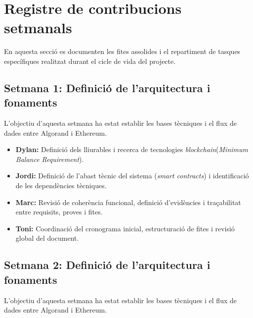 \section{Registre de contribucions setmanals}

En aquesta secció es documenten les fites assolides i el repartiment de tasques específiques realitzat durant el cicle de vida del projecte.

\subsection{Setmana 1: Definició de l'arquitectura i fonaments}

L'objectiu d'aquesta setmana ha estat establir les bases tècniques i el flux de dades entre Algorand i Ethereum.

\begin{itemize}

    \item \textbf{Dylan:} Definició dels lliurables i recerca de tecnologies \textit{blockchain}(\textit{Minimum Balance Requirement}).
    
    \item \textbf{Jordi:} Definició de l'abast tècnic del sistema (\textit{smart contracts}) i identificació de les dependències tècniques.
    
    \item \textbf{Marc:} Revisió de coherència funcional, definició d'evidències i traçabilitat entre requisits, proves i fites.
    
    \item \textbf{Toni:} Coordinació del cronograma inicial, estructuració de fites i revisió global del document.
    
\end{itemize}

\subsection{Setmana 2: Definició de l'arquitectura i fonaments}

L'objectiu d'aquesta setmana ha estat establir les bases tècniques i el flux de dades entre Algorand i Ethereum.

